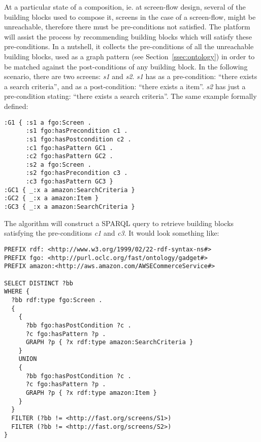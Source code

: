 At a particular state of a composition, ie. at screen-flow design, several of the building blocks used to compose it, 
screens in the case of a screen-flow, might be unreachable, therefore there must be pre-conditions not satisfied. The
platform will assist the process by recommending building blocks which will satisfy these pre-conditions. In a nutshell,
it collects the pre-conditions of all the unreachable building blocks, used as a graph pattern (see Section~\ref{ssec:ontology})
in order to be matched against the post-conditions of any building block. In the following scenario, there are two 
screens: \emph{s1} and \emph{s2}. \emph{s1} has as a pre-condition: ``there exists a search criteria'', and as a 
post-condition: ``there exists a item''. \emph{s2} has just a pre-condition stating: ``there exists a search criteria''.
The same example formally defined:

\begin{listing}
\begin{verbatim}
:G1 { :s1 a fgo:Screen .      
      :s1 fgo:hasPrecondition c1 .
      :s1 fgo:hasPostcondition c2 .
      :c1 fgo:hasPattern GC1 .
      :c2 fgo:hasPattern GC2 .
      :s2 a fgo:Screen .      
      :s2 fgo:hasPrecondition c3 .
      :c3 fgo:hasPattern GC3 }
:GC1 { _:x a amazon:SearchCriteria }
:GC2 { _:x a amazon:Item }
:GC3 { _:x a amazon:SearchCriteria }
\end{verbatim}
\label{lis:discovery_example}
\end{listing}

The algorithm will construct a SPARQL query to retrieve building blocks satisfying the pre-conditions \emph{c1} and \emph{c3}. 
It would look something like:

\begin{listing}
\begin{verbatim}
PREFIX rdf: <http://www.w3.org/1999/02/22-rdf-syntax-ns#>
PREFIX fgo: <http://purl.oclc.org/fast/ontology/gadget#>
PREFIX amazon:<http://aws.amazon.com/AWSECommerceService#>

SELECT DISTINCT ?bb 
WHERE { 
  ?bb rdf:type fgo:Screen . 
  {
    {
      ?bb fgo:hasPostCondition ?c .
      ?c fgo:hasPattern ?p .
      GRAPH ?p { ?x rdf:type amazon:SearchCriteria } 
    }
    UNION
    {
      ?bb fgo:hasPostCondition ?c .
      ?c fgo:hasPattern ?p .
      GRAPH ?p { ?x rdf:type amazon:Item } 
    }
  }
  FILTER (?bb != <http://fast.org/screens/S1>) 
  FILTER (?bb != <http://fast.org/screens/S2>) 
}
\end{verbatim}
\label{lis:sparql_find}
\end{listing}

